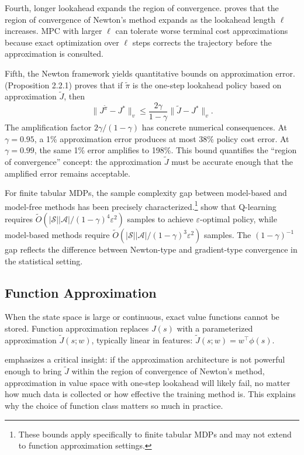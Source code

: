 Fourth, longer lookahead expands the region of convergence. \citet{bertsekas2024} proves that the region of convergence of Newton's method expands as the lookahead length $\ell$ increases. MPC with larger $\ell$ can tolerate worse terminal cost approximations because exact optimization over $\ell$ steps corrects the trajectory before the approximation is consulted.

Fifth, the Newton framework yields quantitative bounds on approximation error. \citet{bertsekas2022} (Proposition 2.2.1) proves that if $\tilde{\pi}$ is the one-step lookahead policy based on approximation $\tilde{J}$, then
\[
\|J^{\tilde{\pi}} - J^*\|_v \leq \frac{2\gamma}{1-\gamma} \|\tilde{J} - J^*\|_v.
\]
The amplification factor $2\gamma/(1-\gamma)$ has concrete numerical consequences. At $\gamma = 0.95$, a 1\% approximation error produces at most 38\% policy cost error. At $\gamma = 0.99$, the same 1\% error amplifies to 198\%. This bound quantifies the ``region of convergence'' concept: the approximation $\tilde{J}$ must be accurate enough that the amplified error remains acceptable.

For finite tabular MDPs, the sample complexity gap between model-based and model-free methods has been precisely characterized.\footnote{These bounds apply specifically to finite tabular MDPs and may not extend to function approximation settings.} \citet{li2024minimax} show that Q-learning requires $\tilde{O}(|\mathcal{S}||\mathcal{A}|/(1-\gamma)^4\varepsilon^2)$ samples to achieve $\varepsilon$-optimal policy, while model-based methods require $\tilde{O}(|\mathcal{S}||\mathcal{A}|/(1-\gamma)^3\varepsilon^2)$ samples. The $(1-\gamma)^{-1}$ gap reflects the difference between Newton-type and gradient-type convergence in the statistical setting.


\subsection{Function Approximation}
\label{sec:function_approx}

When the state space is large or continuous, exact value functions cannot be stored. Function approximation replaces $J(s)$ with a parameterized approximation $\tilde{J}(s; w)$, typically linear in features: $\tilde{J}(s; w) = w^\top \phi(s)$.

\citet{bertsekas2024} emphasizes a critical insight: if the approximation architecture is not powerful enough to bring $\tilde{J}$ within the region of convergence of Newton's method, approximation in value space with one-step lookahead will likely fail, no matter how much data is collected or how effective the training method is. This explains why the choice of function class matters so much in practice.

